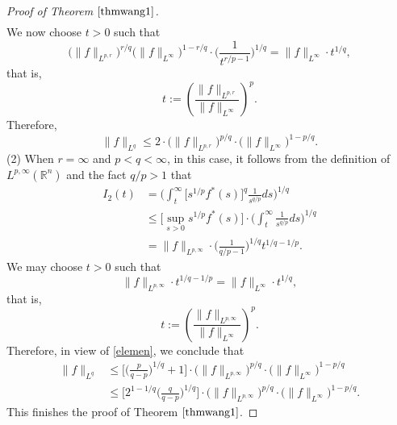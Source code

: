\documentclass{birkjour}
\theoremstyle{definition}
\theoremstyle{remark}
\numberwithin{equation}{section}
\begin{document}
\begin{proof}[Proof of Theorem $\ref{thmwang1}$]
\begin{equation*}
\begin{split}
\end{split}
\end{equation*}
We now choose $t>0$ such that
\begin{equation*}
\big(\|f\|_{L^{p,r}}\big)^{r/q}\big(\|f\|_{L^\infty}\big)^{1-r/q}\cdot\Big(\frac{1}{t^{r/p-1}}\Big)^{1/q}
=\|f\|_{L^\infty}\cdot t^{1/q},
\end{equation*}
that is,
\begin{equation*}
t:=\left(\frac{\|f\|_{L^{p,r}}}{\|f\|_{L^\infty}}\right)^p.
\end{equation*}
Therefore,
\begin{equation*}
\|f\|_{L^q}\leq 2\cdot\big(\|f\|_{L^{p,r}}\big)^{p/q}\cdot\big(\|f\|_{L^\infty}\big)^{1-p/q}.
\end{equation*}
(2) When $r=\infty$ and $p<q<\infty$, in this case, it follows from the definition of $L^{p,\infty}(\mathbb R^n)$ and the fact $q/p>1$ that
\begin{equation*}
\begin{split}
I_2(t)&=\bigg(\int_{t}^{\infty}\big[s^{1/p}f^{*}(s)\big]^{q}\frac{1}{s^{q/p}}ds\bigg)^{1/q}\\
&\leq\Big[\sup_{s>0}s^{1/p}f^{*}(s)\Big]\cdot\bigg(\int_{t}^{\infty}\frac{1}{s^{q/p}}ds\bigg)^{1/q}\\
&=\|f\|_{L^{p,\infty}}\cdot\Big(\frac{1}{q/p-1}\Big)^{1/q} t^{1/q-1/p}.
\end{split}
\end{equation*}
We may choose $t>0$ such that
\begin{equation*}
\|f\|_{L^{p,\infty}}\cdot t^{1/q-1/p}=\|f\|_{L^\infty}\cdot t^{1/q},
\end{equation*}
that is,
\begin{equation*}
t:=\left(\frac{\|f\|_{L^{p,\infty}}}{\|f\|_{L^\infty}}\right)^p.
\end{equation*}
Therefore, in view of \eqref{elemen}, we conclude that
\begin{equation*}
\begin{split}
\|f\|_{L^q}&\leq\Big[\Big(\frac{p}{q-p}\Big)^{1/q}+1\Big]
\cdot\big(\|f\|_{L^{p,\infty}}\big)^{p/q}\cdot\big(\|f\|_{L^\infty}\big)^{1-p/q}\\
&\leq \Big[2^{1-1/q}\Big(\frac{q}{q-p}\Big)^{1/q}\Big]
\cdot\big(\|f\|_{L^{p,\infty}}\big)^{p/q}\cdot\big(\|f\|_{L^\infty}\big)^{1-p/q}.
\end{split}
\end{equation*}
This finishes the proof of Theorem $\ref{thmwang1}$.
\end{proof}
\end{document}
